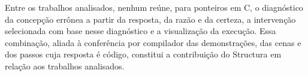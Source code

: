 Entre os trabalhos analisados, nenhum reúne, para ponteiros em C, o diagnóstico da concepção errônea a partir da resposta, da razão e da certeza, a intervenção selecionada com base nesse diagnóstico e a visualização da execução. Essa combinação, aliada à conferência por compilador das demonstrações, das cenas e dos passos cuja resposta é código, constitui a contribuição do Structura em relação aos trabalhos analisados.
